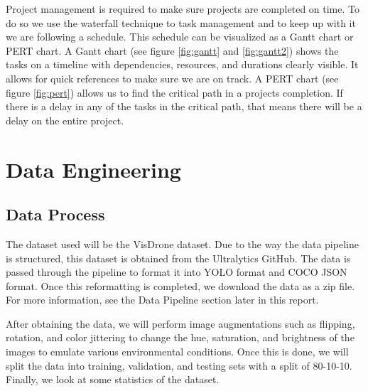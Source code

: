 \documentclass[stu,12pt,floatsintext]{apa7}
\begin{document}
Project management is required to make sure projects are completed on time. To do so we use the waterfall technique to task management and to keep up with it we are following a schedule. This schedule can be visualized as a Gantt chart or PERT chart. A Gantt chart (see figure \ref{fig:gantt} and \ref{fig:gantt2}) shows the tasks on a timeline with dependencies, resources, and durations clearly visible. It allows for quick references to make sure we are on track. A PERT chart (see figure \ref{fig:pert}) allows us to find the critical path in a projects completion. If there is a delay in any of the tasks in the critical path, that means there will be a delay on the entire project.

\section{Data Engineering}
\subsection{Data Process}
The dataset used will be the VisDrone dataset. Due to the way the data pipeline is structured, this dataset is obtained from the Ultralytics GitHub. The data is passed through the pipeline to format it into YOLO format and COCO JSON format. Once this reformatting is completed, we download the data as a zip file. For more information, see the Data Pipeline section later in this report.

After obtaining the data, we will perform image augmentations such as flipping, rotation, and color jittering to change the hue, saturation, and brightness of the images to emulate various environmental conditions. Once this is done, we will split the data into training, validation, and testing sets with a split of 80-10-10. Finally, we look at some statistics of the dataset.
\end{document}
